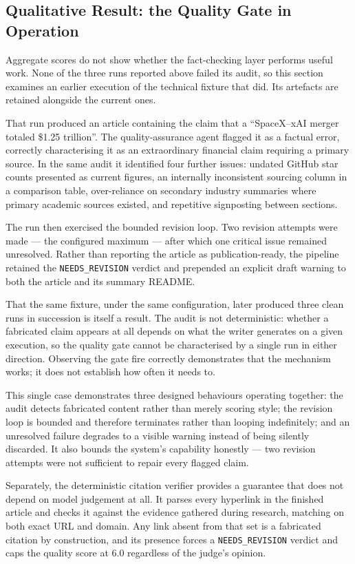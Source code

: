 \subsection{Qualitative Result: the Quality Gate in Operation}

Aggregate scores do not show whether the fact-checking layer performs useful
work. None of the three runs reported above failed its audit, so this section
examines an earlier execution of the technical fixture that did. Its artefacts
are retained alongside the current ones.

That run produced an article containing the claim that a ``SpaceX--xAI merger
totaled \$1.25 trillion''. The quality-assurance agent flagged it as a factual
error, correctly characterising it as an extraordinary financial claim
requiring a primary source. In the same audit it identified four further
issues: undated GitHub star counts presented as current figures, an internally
inconsistent sourcing column in a comparison table, over-reliance on secondary
industry summaries where primary academic sources existed, and repetitive
signposting between sections.

The run then exercised the bounded revision loop. Two revision attempts were
made --- the configured maximum --- after which one critical issue remained
unresolved. Rather than reporting the article as publication-ready, the pipeline
retained the \texttt{NEEDS\_REVISION} verdict and prepended an explicit draft
warning to both the article and its summary README.

That the same fixture, under the same configuration, later produced three clean
runs in succession is itself a result. The audit is not deterministic: whether a
fabricated claim appears at all depends on what the writer generates on a given
execution, so the quality gate cannot be characterised by a single run in either
direction. Observing the gate fire correctly demonstrates that the mechanism
works; it does not establish how often it needs to.

This single case demonstrates three designed behaviours operating together: the
audit detects fabricated content rather than merely scoring style; the revision
loop is bounded and therefore terminates rather than looping indefinitely; and
an unresolved failure degrades to a visible warning instead of being silently
discarded. It also bounds the system's capability honestly --- two revision
attempts were not sufficient to repair every flagged claim.

Separately, the deterministic citation verifier provides a guarantee that does
not depend on model judgement at all. It parses every hyperlink in the finished
article and checks it against the evidence gathered during research, matching on
both exact URL and domain. Any link absent from that set is a fabricated
citation by construction, and its presence forces a \texttt{NEEDS\_REVISION}
verdict and caps the quality score at 6.0 regardless of the judge's opinion.

